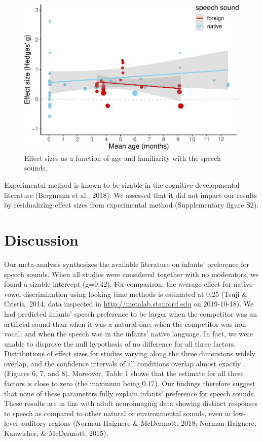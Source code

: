 \documentclass[man]{apa6}
\begin{document}
\begin{figure}
\centering
\includegraphics{MA_speech_pref_files/figure-latex/unnamed-chunk-4-1.pdf}
\caption{\label{fig:unnamed-chunk-4}Effect sizes as a function of age and
familiarity with the speech sounds.}
\end{figure}

Experimental method is known to be sizable in the cognitive
developmental literature (Bergmann et al., 2018). We assessed that it
did not impact our results by residualizing effect sizes from
experimental method (Supplementary figure S2).

\section{Discussion}\label{discussion}

Our meta-analysis synthesizes the available literature on infants'
preference for speech sounds. When all studies were considered together
with no moderators, we found a sizable intercept (g=0.42). For
comparison, the average effect for native vowel discrimination using
looking time methods is estimated at 0.25 (Tsuji \& Cristia, 2014, data
inspected in \url{http://metalab.stanford.edu} on 2019-10-18). We had
predicted infants' speech preference to be larger when the competitor
was an artificial sound than when it was a natural one; when the
competitor was non-vocal; and when the speech was in the infants' native
language. In fact, we were unable to disprove the null hypothesis of no
difference for all three factors. Distributions of effect sizes for
studies varying along the three dimensions widely overlap, and the
confidence intervals of all conditions overlap almost exactly (Figures
6, 7, and 8). Moreover, Table 1 shows that the estimate for all these
factors is close to zero (the maximum being 0.17). Our findings
therefore suggest that none of these parameters fully explain infants'
preference for speech sounds. These results are in line with adult
neuroimaging data showing distinct responses to speech as compared to
other natural or environmental sounds, even in low-level auditory
regions (Norman-Haignere \& McDermott, 2018; Norman-Haignere, Kanwisher,
\& McDermott, 2015).
\end{document}
